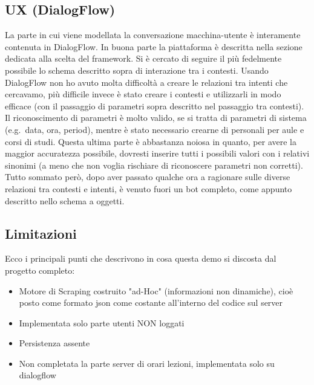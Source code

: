 \documentclass[]{article}
\begin{document}
\subsection{UX (DialogFlow)}
La parte in cui viene modellata la conversazione macchina-utente è interamente contenuta in DialogFlow. In buona parte la piattaforma è descritta nella sezione dedicata alla scelta del framework. Si è cercato di seguire il più fedelmente possibile lo schema descritto sopra di interazione tra i contesti. Usando DialogFlow non ho avuto molta difficoltà a creare le relazioni tra intenti che cercavamo, più difficile invece è stato creare i contesti e utilizzarli in modo efficace (con il passaggio di parametri sopra descritto nel passaggio tra contesti). Il riconoscimento di parametri è molto valido, se si tratta di parametri di sistema (e.g.\ data, ora, period), mentre è stato necessario crearne di personali per aule e corsi di studi. Questa ultima parte è abbastanza noiosa in quanto, per avere la maggior accuratezza possibile, dovresti inserire tutti i possibili valori con i relativi sinonimi (a meno che non voglia rischiare di riconoscere parametri non corretti). Tutto sommato però, dopo aver passato qualche ora a ragionare sulle diverse relazioni tra contesti e intenti, è venuto fuori un bot completo, come appunto descritto nello schema a oggetti.  

\subsection{Limitazioni}
Ecco i principali punti che descrivono in cosa questa demo si discosta dal progetto completo:
\begin{itemize}
\item Motore di Scraping costruito "ad-Hoc" (informazioni non dinamiche), cioè posto come formato json come costante all'interno del codice sul server
\item Implementata solo parte utenti NON loggati
\item Persistenza assente
\item  Non completata la parte server di orari lezioni, implementata solo su dialogflow
\end{itemize}
\end{document}
